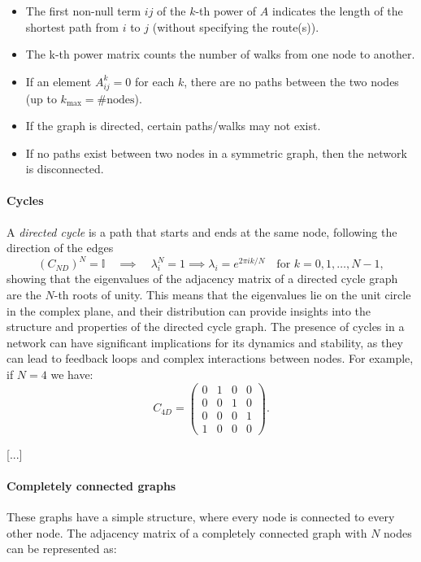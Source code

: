 \begin{itemize}
    \item The first non-null term \(ij\) of the \(k\)-th power of \(A\) indicates the length of the shortest path from \(i\) to \(j\) (without specifying the route(s)).
    \item The k-th power matrix counts the number of walks from one node to another.
    \item If an element \(A^k_{ij} = 0\) for each \(k\), there are no paths between the two nodes (up to \(k_{\text{max}} = \#\text{nodes}\)).
    \item If the graph is directed, certain paths/walks may not exist.
    \item If no paths exist between two nodes in a symmetric graph, then the network is disconnected.
\end{itemize}

\paragraph{Cycles}
A \textit{directed cycle} is a path that starts and ends at the same node, following the direction of the edges
\[
    (C_{ND})^N = \mathbb{I} \quad \implies \quad \lambda_i^N = 1 \implies \lambda_i = e^{2\pi i k/N} \quad \text{for } k = 0, 1, \ldots, N-1,
\]
showing that the eigenvalues of the adjacency matrix of a directed cycle graph are the \(N\)-th roots of unity. This means that the eigenvalues lie on the unit circle in the complex plane, and their distribution can provide insights into the structure and properties of the directed cycle graph. The presence of cycles in a network can have significant implications for its dynamics and stability, as they can lead to feedback loops and complex interactions between nodes. For example, if \(N=4\) we have:
\[
    C_{4D} = \begin{pmatrix}
        0 & 1 & 0 & 0 \\
        0 & 0 & 1 & 0 \\
        0 & 0 & 0 & 1 \\
        1 & 0 & 0 & 0
    \end{pmatrix}.
\]

[...]

\paragraph{Completely connected graphs}

These graphs have a simple structure, where every node is connected to every other node. The adjacency matrix of a completely connected graph with \(N\) nodes can be represented as:

